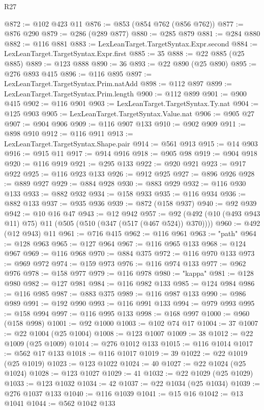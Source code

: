 \begin{lexlean}{R27}
\begin{coremodule}
@872 := @102 @423 @11
@876 := @853 (@854 @762 (@856 @762))
@877 := @876 @290
@879 := @286 (@289 @877)
@880 := @285 @879
@881 := @284 @880
@882 := @116 @881
@883 := LexLeanTarget.TargetSyntax.Expr.second
@884 := LexLeanTarget.TargetSyntax.Expr.first
@885 := 35
@888 := @22 @885 (@25 @885)
@889 := @123 @888
@890 := 36
@893 := @22 @890 (@25 @890)
@895 := @276 @893 @415
@896 := @116 @895
@897 := LexLeanTarget.TargetSyntax.Prim.natAdd
@898 := @112 @897
@899 := LexLeanTarget.TargetSyntax.Prim.length
@900 := @112 @899
@901 := @900 @415
@902 := @116 @901
@903 := LexLeanTarget.TargetSyntax.Ty.nat
@904 := @125 @903
@905 := LexLeanTarget.TargetSyntax.Value.nat
@906 := @905 @27
@907 := @904 @906
@909 := @116 @907 @133
@910 := @902 @909
@911 := @898 @910
@912 := @116 @911
@913 := LexLeanTarget.TargetSyntax.Shape.pair
@914 := @561 @913
@915 := @14 @903
@916 := @915 @11
@917 := @914 @916
@918 := @905 @98
@919 := @904 @918
@920 := @116 @919
@921 := @295 @133
@922 := @920 @921
@923 := @917 @922
@925 := @116 @923 @133
@926 := @912 @925
@927 := @896 @926
@928 := @889 @927
@929 := @884 @928
@930 := @883 @929
@932 := @116 @930 @133
@933 := @882 @932
@934 := @158 @933
@935 := @116 @934
@936 := @882 @133
@937 := @935 @936
@939 := @872 (@158 @937)
@940 := @92 @939
@942 := @10 @16 @47
@943 := @12 @942
@957 := @92 (@492 (@10 (@493 @943 @11) @75) @11 (@505 (@510 (@347 (@517 (@467 @524)) @370))))
@960 := @492 (@12 @943) @11
@961 := @716 @415
@962 := @116 @961
@963 := "path"
@964 := @128 @963
@965 := @127 @964
@967 := @116 @965 @133
@968 := @124 @967
@969 := @116 @968
@970 := @884 @375
@972 := @116 @970 @133
@973 := @969 @972
@974 := @159 @973
@976 := @116 @974 @133
@977 := @962 @976
@978 := @158 @977
@979 := @116 @978
@980 := "kappa"
@981 := @128 @980
@982 := @127 @981
@984 := @116 @982 @133
@985 := @124 @984
@986 := @116 @985
@987 := @883 @375
@989 := @116 @987 @133
@990 := @986 @989
@991 := @192 @990
@993 := @116 @991 @133
@994 := @979 @993
@995 := @158 @994
@997 := @116 @995 @133
@998 := @168 @997
@1000 := @960 (@158 @998)
@1001 := @92 @1000
@1003 := @102 @74 @17
@1004 := 37
@1007 := @22 @1004 (@25 @1004)
@1008 := @123 @1007
@1009 := 38
@1012 := @22 @1009 (@25 @1009)
@1014 := @276 @1012 @133
@1015 := @116 @1014
@1017 := @562 @17 @133
@1018 := @116 @1017
@1019 := 39
@1022 := @22 @1019 (@25 @1019)
@1023 := @123 @1022
@1024 := 40
@1027 := @22 @1024 (@25 @1024)
@1028 := @123 @1027
@1029 := 41
@1032 := @22 @1029 (@25 @1029)
@1033 := @123 @1032
@1034 := 42
@1037 := @22 @1034 (@25 @1034)
@1039 := @276 @1037 @133
@1040 := @116 @1039
@1041 := @15 @16
@1042 := @13 @1041
@1044 := @562 @1042 @133

\end{coremodule}
\end{lexlean}
